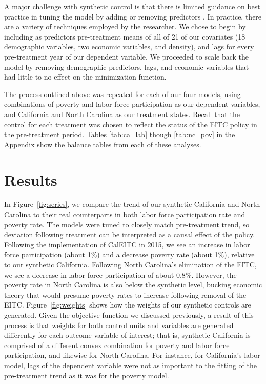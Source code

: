 \documentclass{article}
\begin{document}
A major challenge with synthetic control is that there is limited guidance on best practice in tuning the model by adding or removing predictors \citep{ferman2020cherry}. In practice, there are a variety of techniques employed by the researcher. We chose to begin by including as predictors pre-treatment means of all of 21 of our covariates (18 demographic variables, two economic variables, and density), and lags for every pre-treatment year of our dependent variable. We proceeded to scale back the model by removing demographic predictors, lags, and economic variables that had little to no effect on the minimization function. 

The process outlined above was repeated for each of our four models, using combinations of poverty and labor force participation as our dependent variables, and California and North Carolina as our treatment states. Recall that the control for each treatment was chosen to reflect the status of the EITC policy in the pre-treatment period. Tables \ref{tab:ca_lab} though \ref{tab:nc_pov} in the Appendix show the balance tables from each of these analyses.


\section{Results}

In Figure~\ref{fig:series}, we compare the trend of our synthetic California and North Carolina to their real counterparts in both labor force participation rate and poverty rate. The models were tuned to closely match pre-treatment trend, so deviation following treatment can be interpreted as a causal effect of the policy. Following the implementation of CalEITC in 2015, we see an increase in labor force participation (about 1\%) and a decrease poverty rate (about 1\%), relative to our synthetic California. Following North Carolina's elimination of the EITC, we see a decrease in labor force participation of about 0.8\%. However, the poverty rate in North Carolina is also below the synthetic level, bucking economic theory that would presume poverty rates to increase following removal of the EITC. Figure~\ref{fig:weights} shows how the weights of our synthetic controls are generated. Given the objective function we discussed previously, a result of this process is that weights for both control units and variables are generated differently for each outcome variable of interest; that is, synthetic California is comprised of a different convex combination for poverty and labor force participation, and likewise for North Carolina. For instance, for California's labor model, lags of the dependent variable were not as important to the fitting of the pre-treatment trend as it was for the poverty model. 
\end{document}
